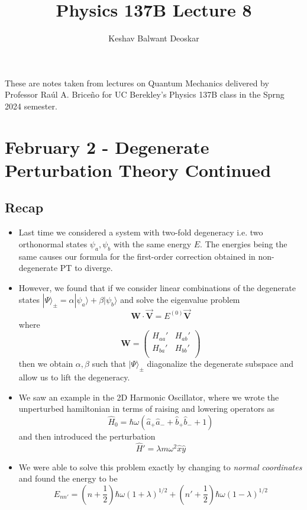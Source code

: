\documentclass{article}
\title{Physics 137B Lecture 8}
\author{Keshav Balwant Deoskar}
\newcommand{\ket}[1]{|#1 \rangle}
\begin{document}
\maketitle

These are notes taken from lectures on Quantum Mechanics delivered by Professor Raúl A. Briceño for UC Berekley's Physics 137B class in the Sprng 2024 semester.

\tableofcontents

\pagebreak

\section{February 2 - Degenerate Perturbation Theory Continued}

\vskip 1cm
\subsection*{Recap}
\begin{itemize}
  \item Last time we considered a system with two-fold degeneracy i.e. two orthonormal states $\psi_a, \psi_b$ with the same energy $E$. The energies being the same causes our formula for the first-order correction obtained in non-degenerate PT to diverge.
  \item However, we found that if we consider linear combinations of the degenerate states $\ket{\Psi}_{\pm} = \alpha \ket{\psi_a} + \beta \ket{\psi_b}$ and solve the eigenvalue problem 
  \[ \mathbf{W} \cdot \mathbf{\vec{V}} = E^{(0)} \mathbf{\vec{V}} \] 
  where 
  \[ \mathbf{W} = \begin{pmatrix}
    H_{aa}' & H_{ab}' \\
    H_{ba}' & H_{bb}' \\
  \end{pmatrix} \]
  then we obtain $\alpha, \beta$ such that $\ket{\Psi}_{\pm}$ diagonalize the degenerate subspace and allow us to lift the degeneracy.

  \vskip 0.5cm
  \item We saw an example in the 2D Harmonic Oscillator, where we wrote the unperturbed hamiltonian in terms of raising and lowering operators as 
  \[ \hat{H}_0 = \hbar \omega \left( \hat{a}_{+} \hat{a}_{-} + \hat{b}_{+} \hat{b}_{-} + 1 \right) \]
  and then introduced the perturbation 
  \[ \hat{H}' = \lambda m \omega^2 \hat{x} \hat{y}\]
  
  \item We were able to solve this problem exactly by changing to \emph{normal coordinates} and found the energy to be 
  \[ E_{nn'} = \left( n + \frac{1}{2} \right) \hbar \omega \left( 1 + \lambda \right)^{1/2} +  \left( n' + \frac{1}{2} \right) \hbar \omega \left( 1 - \lambda \right)^{1/2}   \]
\end{itemize}
\end{document}
